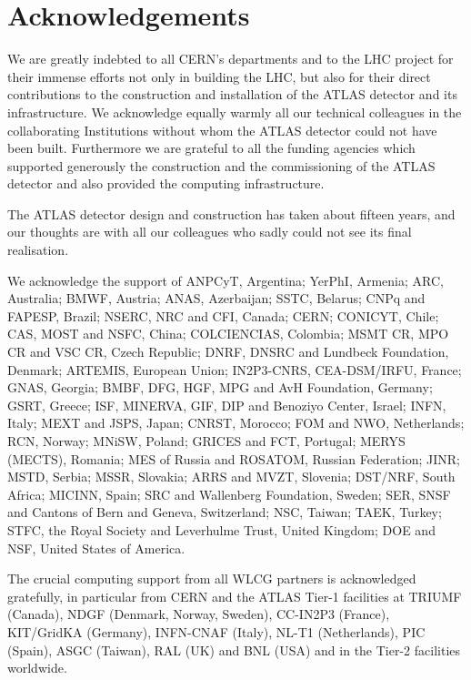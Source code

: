 \documentclass[11pt,a4paper,dvips]{article}
\begin{document}
\section{Acknowledgements}

We are greatly indebted to all CERN's departments and to the LHC project for their immense efforts not only in building the LHC, but also for their direct contributions to the construction and installation of the ATLAS detector and its infrastructure. We acknowledge equally warmly all our technical colleagues in the collaborating Institutions without whom the ATLAS detector could not have been built. Furthermore we are grateful to all the funding agencies which supported generously the construction and the commissioning of the ATLAS detector and also provided the computing infrastructure.

The ATLAS detector design and construction has taken about fifteen years, and our thoughts are with all our colleagues who sadly could not see its final realisation.

We acknowledge the support of ANPCyT, Argentina; YerPhI, Armenia; ARC, Australia; BMWF, Austria; ANAS, Azerbaijan; SSTC, Belarus; CNPq and FAPESP, Brazil; NSERC, NRC and CFI, Canada; CERN; CONICYT, Chile; CAS, MOST and NSFC, China; COLCIENCIAS, Colombia; MSMT CR, MPO CR and VSC CR, Czech Republic;  DNRF, DNSRC and Lundbeck Foundation, Denmark; ARTEMIS, European Union; IN2P3-CNRS, CEA-DSM/IRFU, France; GNAS, Georgia; BMBF, DFG, HGF, MPG and AvH Foundation, Germany; GSRT, Greece; ISF, MINERVA, GIF, DIP and Benoziyo Center, Israel; INFN, Italy; MEXT and JSPS, Japan; CNRST, Morocco; FOM and NWO, Netherlands; RCN, Norway;  MNiSW, Poland; GRICES and FCT, Portugal;  MERYS (MECTS), Romania;  MES of Russia and ROSATOM, Russian Federation; JINR; MSTD, Serbia; MSSR, Slovakia; ARRS and MVZT, Slovenia; DST/NRF, South Africa; MICINN, Spain; SRC and Wallenberg Foundation, Sweden; SER,  SNSF and Cantons of Bern and Geneva, Switzerland;  NSC, Taiwan; TAEK, Turkey; STFC, the Royal Society and Leverhulme Trust, United Kingdom; DOE and NSF, United States of America.  

The crucial computing support from all WLCG partners is acknowledged gratefully, in particular from CERN and the ATLAS Tier-1 facilities at TRIUMF (Canada), NDGF (Denmark, Norway, Sweden), CC-IN2P3 (France), KIT/GridKA (Germany), INFN-CNAF (Italy), NL-T1 (Netherlands), PIC (Spain), ASGC (Taiwan), RAL (UK) and BNL (USA) and in the Tier-2 facilities worldwide.
\end{document}

